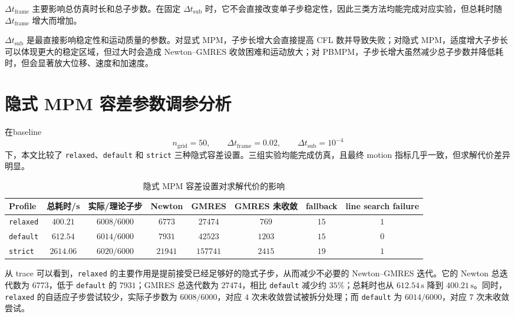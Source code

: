\documentclass[a4paper]{article}
\begin{document}
$\Delta t_{\mathrm{frame}}$ 主要影响总仿真时长和总子步数。在固定 $\Delta t_{\mathrm{sub}}$ 时，它不会直接改变单子步稳定性，因此三类方法均能完成对应实验，但总耗时随 $\Delta t_{\mathrm{frame}}$ 增大而增加。

$\Delta t_{\mathrm{sub}}$ 是最直接影响稳定性和运动质量的参数。对显式 MPM，子步长增大会直接提高 CFL 数并导致失败；对隐式 MPM，适度增大子步长可以体现更大的稳定区域，但过大时会造成 Newton--GMRES 收敛困难和运动放大；对 PBMPM，子步长增大虽然减少总子步数并降低耗时，但会显著放大位移、速度和加速度。

\section{隐式 MPM 容差参数调参分析}

在baseline
\[
    n_{\mathrm{grid}}=50,\qquad
    \Delta t_{\mathrm{frame}}=0.02,\qquad
    \Delta t_{\mathrm{sub}}=10^{-4}
\]
下，本文比较了 \texttt{relaxed}、\texttt{default} 和 \texttt{strict} 三种隐式容差设置。三组实验均能完成仿真，且最终 motion 指标几乎一致，但求解代价差异明显。

\begin{table}[H]
\centering
\caption{隐式 MPM 容差设置对求解代价的影响}
\label{tab:implicit-profile-cost}
\small
\begin{tabular}{lccccccc}
\toprule
Profile & 总耗时/s & 实际/理论子步 & Newton & GMRES & GMRES 未收敛 & fallback & line search failure \\
\midrule
\texttt{relaxed} & $400.21$ & $6008/6000$ & $6773$ & $27474$ & $769$ & $15$ & $1$ \\
\texttt{default} & $612.54$ & $6014/6000$ & $7931$ & $42523$ & $1203$ & $15$ & $0$ \\
\texttt{strict} & $2614.06$ & $6020/6000$ & $21941$ & $157741$ & $2415$ & $19$ & $1$ \\
\bottomrule
\end{tabular}
\end{table}


从 trace 可以看到，\texttt{relaxed} 的主要作用是提前接受已经足够好的隐式子步，从而减少不必要的 Newton--GMRES 迭代。它的 Newton 总迭代数为 $6773$，低于 \texttt{default} 的 $7931$；GMRES 总迭代数为 $27474$，相比 \texttt{default} 减少约 $35\%$；总耗时也从 $612.54\,\mathrm{s}$ 降到 $400.21\,\mathrm{s}$。同时，\texttt{relaxed} 的自适应子步尝试较少，实际子步数为 $6008/6000$，对应 $4$ 次未收敛尝试被拆分处理；而 \texttt{default} 为 $6014/6000$，对应 $7$ 次未收敛尝试。
\end{document}
